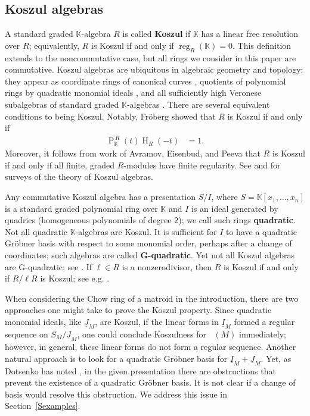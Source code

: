 \documentclass[11pt, reqno]{amsart}
\DeclareMathOperator{\Chow}{\underline{CH}}		%
\DeclareMathOperator{\HS}{\mathrm{H}}
\newcommand{\kk}{\mathbb{K}}					%
\DeclareMathOperator{\Poin}{P}
\DeclareMathOperator{\reg}{reg}					%
\newcommand{\term}[1]{\textbf{\textsf{#1}}}
\theoremstyle{definition}
\numberwithin{equation}{section}
\numberwithin{table}{section}
\begin{document}
\begin{spacing}{1.1}
\subsection{Koszul algebras}\label{SSKoszul}
A standard graded $\kk$-algebra $R$ is called \term{Koszul} if $\kk$ has a linear free resolution over $R$; equivalently, $R$ is Koszul if and only if $\reg_R(\kk) = 0$.  This definition extends to the noncommutative case, but all rings we consider in this paper are commutative.  Koszul algebras are ubiquitous in algebraic geometry and topology; they appear as coordinate rings of canonical curves \cite{VF93}, quotients of polynomial rings by quadratic monomial ideals \cite{Fro75}, and all sufficiently high Veronese subalgebras of standard graded $\kk$-algebras \cite{Bac86}.  There are several equivalent conditions to being Koszul.  Notably, Fr\"oberg \cite{Fro99} showed that $R$ is Koszul if and only if 
\begin{align}\label{PHS1}\Poin_\kk^{\,R}(t)\HS_R(-t) &= 1.\end{align}
Moreover, it follows from work of Avramov, Eisenbud, and Peeva \cite{AE92, AP01} that $R$ is Koszul if and only if all finite, graded $R$-modules have finite regularity.  See \cite{Con14} and \cite{Fro99} for surveys of the theory of Koszul algebras.  

Any commutative Koszul algebra has a presentation $S/I$, where $S = \kk[x_1,\ldots,x_n]$ is a standard graded polynomial ring over $\kk$ and $I$ is an ideal generated by quadrics (homogeneous polynomials of degree $2$); we call such rings \term{quadratic}.  Not all quadratic $\kk$-algebras are Koszul.  It is sufficient for $I$ to have a quadratic Gr\"obner basis with respect to some monomial order, perhaps after a change of coordinates; such algebras are called \term{G-quadratic}. Yet not all Koszul algebras are G-quadratic; see \cite[Remark 1.14]{Con14}.  If $\ell \in R$ is a nonzerodivisor, then $R$ is Koszul if and only if $R/\ell R$ is Koszul; see e.g. \cite[Theorem 3.1]{CDR13}.  

When considering the Chow ring of a matroid in the introduction, there are two approaches one might take to prove the Koszul property.  Since quadratic monomial ideals, like $\underline{J}_M$, are Koszul, if the linear forms in $\underline{I}_M$ formed a regular sequence on $S_M/\underline{J}_M$, one could conclude Koszulness for $\Chow(M)$ immediately; however, in general, these linear forms do not form a regular sequence.  Another natural approach is to look for a quadratic Gr\"obner basis for $\underline{I}_M + \underline{J}_M$.  Yet, as Dotsenko has noted \cite{Dot20}, in the given presentation there are obstructions that prevent the existence of a quadratic Gr\"obner basis.  It is not clear if a change of basis would resolve this obstruction.  We address this issue in Section~\ref{Sexamples}.


\end{spacing}
\end{document}
